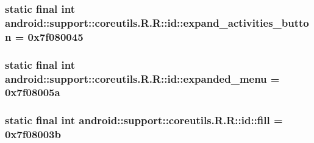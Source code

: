 \hypertarget{classandroid_1_1support_1_1coreutils_1_1_r_1_1id_3756fc65bc0126027618ccdd8955b659}{
\subsubsection[{expand\_\-activities\_\-button}]{\setlength{\rightskip}{0pt plus 5cm}static final int android::support::coreutils.R.R::id::expand\_\-activities\_\-button = 0x7f080045}}
\label{classandroid_1_1support_1_1coreutils_1_1_r_1_1id_3756fc65bc0126027618ccdd8955b659}


\hypertarget{classandroid_1_1support_1_1coreutils_1_1_r_1_1id_2c4e71a6ea67a8359d550df889427d8f}{
\subsubsection[{expanded\_\-menu}]{\setlength{\rightskip}{0pt plus 5cm}static final int android::support::coreutils.R.R::id::expanded\_\-menu = 0x7f08005a}}
\label{classandroid_1_1support_1_1coreutils_1_1_r_1_1id_2c4e71a6ea67a8359d550df889427d8f}


\hypertarget{classandroid_1_1support_1_1coreutils_1_1_r_1_1id_fc7c7adcd428988aa8f35b9f6f981e43}{
\subsubsection[{fill}]{\setlength{\rightskip}{0pt plus 5cm}static final int android::support::coreutils.R.R::id::fill = 0x7f08003b}}
\label{classandroid_1_1support_1_1coreutils_1_1_r_1_1id_fc7c7adcd428988aa8f35b9f6f981e43}



